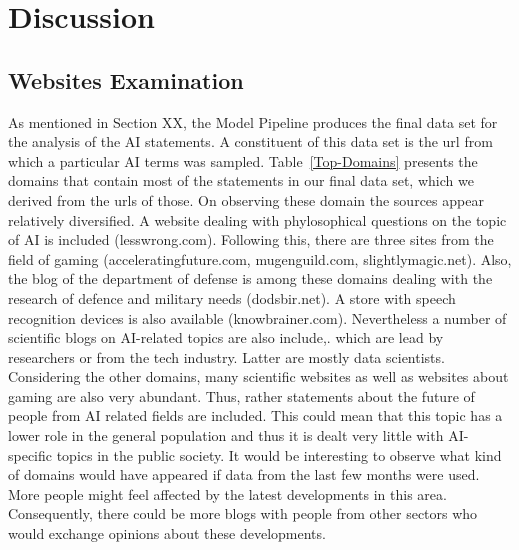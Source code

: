 \section{Discussion}

\subsection{Websites Examination}

As mentioned in Section XX, the Model Pipeline produces the final data set for the analysis of the AI statements. 
A constituent of this data set is the url from which a particular AI terms was sampled.
Table~\ref{Top-Domains} presents the domains that contain most of the statements in our final data set, which we derived from the urls of those.
On observing these domain the sources appear relatively diversified.
A website dealing with phylosophical questions on the topic of AI is included (lesswrong.com). 
Following this, there are three sites from the field of gaming (acceleratingfuture.com, mugenguild.com, slightlymagic.net).
Also, the blog of the department of defense is among these domains dealing with the research of defence and military needs (dodsbir.net).
A store with speech recognition devices is also available (knowbrainer.com).
Nevertheless a number of scientific blogs on AI-related topics are also include,. which are lead by researchers or from the tech industry.
Latter are mostly data scientists.
Considering the other domains, many scientific websites as well as websites about gaming are also very abundant.
Thus, rather statements about the future of people from AI related fields are included.
This could mean that this topic has a lower role in the general population and thus it is dealt very little with AI-specific topics in the public society.
It would be interesting to observe what kind of domains would have appeared if data from the last few months were used.
More people might feel affected by the latest developments in this area.
Consequently, there could be more blogs with people from other sectors who would exchange opinions about these developments.
